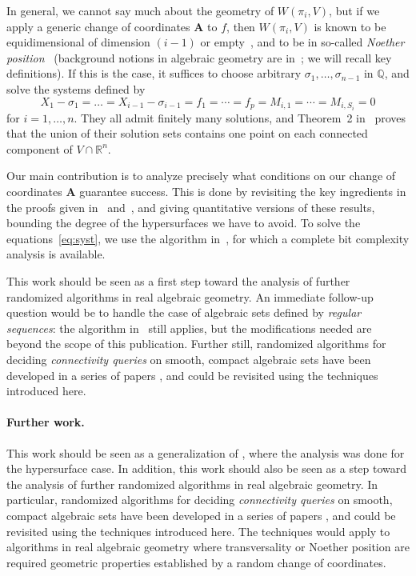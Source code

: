 \documentclass[12pt]{article}
\def\mA{{\bm A}}
\def\Q{\mathbb{Q}}
\def\R{\mathbb{R}}
\begin{document}
In general, we cannot say much about the geometry of $W(\pi_i,V)$, but
if we apply a generic change of coordinates $\mA$ to $f$, then
$W(\pi_i,V)$ is known to be equidimensional of dimension $(i-1)$ or
empty~\cite{BaGiHeMb97}, and to be in so-called {\em Noether
  position}~\cite{EMP} (background notions in algebraic geometry are
in~\cite{Mumford76,Shafarevich77,ECA}; we will recall key
definitions). If this is the case, it suffices to choose arbitrary
$\sigma_1,\dots,\sigma_{n-1}$ in $\Q$, and solve the systems defined
by
\begin{equation}\label{eq:syst1}
  X_1-\sigma_1 = \dots = X_{i-1}-\sigma_{i-1} = f_1 = \cdots = f_p = M_{i,1} = \cdots = M_{i,S_i} = 0
\end{equation}
for $i=1,\dots,n$.  They all admit finitely many solutions, and
Theorem~2 in~\cite{EMP} proves that the union of their solution sets
contains one point on each connected component of $V \cap \R^n$.

Our main contribution is to analyze precisely what conditions on our
change of coordinates $\mA$ guarantee success. This is done by
revisiting the key ingredients in the proofs given
in~\cite{BaGiHeMb97} and~\cite{EMP}, and giving quantitative versions
of these results, bounding the degree of the hypersurfaces we have to
avoid.  To solve the equations~\eqref{eq:syst}, we use the algorithm
in~\cite{SH}, for which a complete bit complexity analysis is
available.

This work should be seen as a first step toward the analysis of
further randomized algorithms in real algebraic geometry. An immediate
follow-up question would be to handle the case of algebraic sets
defined by {\em regular sequences}: the algorithm in~\cite{EMP} still
applies, but the modifications needed are beyond the scope of this
publication. Further still, randomized algorithms for deciding {\em
  connectivity queries} on smooth, compact algebraic sets have been
developed in a series of papers
\cite{SchostMohabBabySteps2011,SchostMohabBabySteps2014}, and could be
revisited using the techniques introduced here.


\paragraph*{Further work.}
This work should be seen as a generalization of \cite{ElGiSc20}, where
the analysis was done for the hypersurface case. In addition, this
work should also be seen as a step toward the analysis of further
randomized algorithms in real algebraic geometry.  In particular,
randomized algorithms for deciding {\em connectivity queries} on
smooth, compact algebraic sets have been developed in a series of
papers \cite{SchostMohabBabySteps2011,SchostMohabBabySteps2014}, and
could be revisited using the techniques introduced here. The
techniques would apply to algorithms in real algebraic geometry where
transversality or Noether position are required geometric properties
established by a random change of coordinates.
\end{document}
